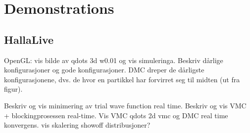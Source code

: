 \section{Demonstrations}

\subsection{HallaLive}

\begin{frame}
 OpenGL: vis bilde av qdots 3d w0.01 og vis simuleringa. Beskriv dårlige konfigurasjoner og gode konfigurasjoner.
 DMC dreper de dårligste konfigurasjonene, dvs. de hvor en partikkel har forvirret seg til midten (ut fra figur).
\end{frame}


\begin{frame}
 Beskriv og vis minimering av trial wave function real time.
 Beskriv og vis VMC + blockingprosessen real-time.
 Vis VMC qdots 2d vmc og DMC real time konvergens.
 vis skalering
 showoff distribusjoner?
\end{frame}